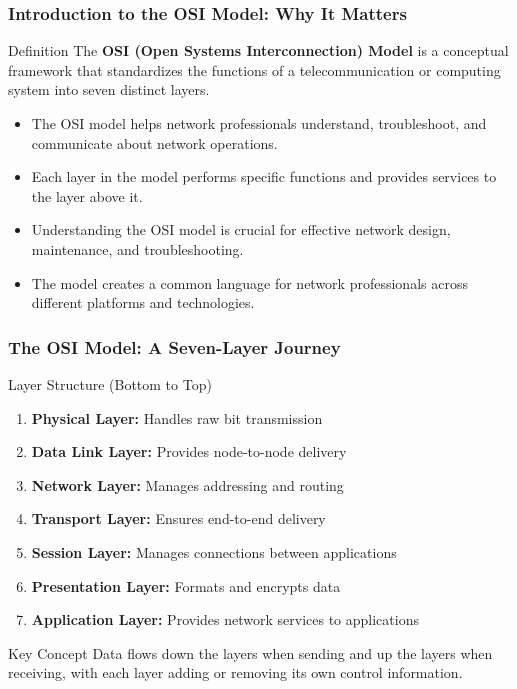 \documentclass{beamer}
\begin{document}
\begin{frame}
    \frametitle{Introduction to the OSI Model: Why It Matters}
    
    \begin{alertblock}{Definition}
        The \textbf{OSI (Open Systems Interconnection) Model} is a conceptual framework that standardizes the functions of a telecommunication or computing system into seven distinct layers.
    \end{alertblock}
    
    \begin{itemize}
        \item The OSI model helps network professionals understand, troubleshoot, and communicate about network operations.
        
        \item Each layer in the model performs specific functions and provides services to the layer above it.
        
        \item Understanding the OSI model is crucial for effective network design, maintenance, and troubleshooting.
        
        \item The model creates a common language for network professionals across different platforms and technologies.
    \end{itemize}
\end{frame}

\begin{frame}
    \frametitle{The OSI Model: A Seven-Layer Journey}
    
    \begin{block}{Layer Structure (Bottom to Top)}
        \begin{enumerate}
            \item \textbf{Physical Layer:} Handles raw bit transmission
            \item \textbf{Data Link Layer:} Provides node-to-node delivery
            \item \textbf{Network Layer:} Manages addressing and routing
            \item \textbf{Transport Layer:} Ensures end-to-end delivery
            \item \textbf{Session Layer:} Manages connections between applications
            \item \textbf{Presentation Layer:} Formats and encrypts data
            \item \textbf{Application Layer:} Provides network services to applications
        \end{enumerate}
    \end{block}
    
    \begin{alertblock}{Key Concept}
        Data flows down the layers when sending and up the layers when receiving, with each layer adding or removing its own control information.
    \end{alertblock}
\end{frame}
\end{document}
